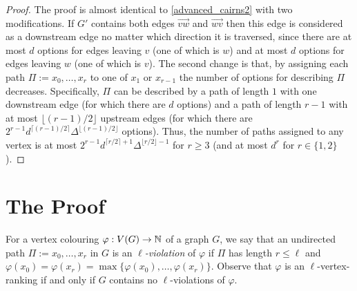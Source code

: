 \documentclass{patmorin}
\newcommand{\defin}[1]{\emph{\color{brightmaroon}#1}}
\newcommand{\rn}[1]{\chi_{\operatorname{#1-vr}}}
\newcommand{\lrn}{\rn{\ell}}
\begin{document}
\begin{proof}
  The proof is almost identical to \cref{advanced_cairns2} with two modifications.  If $G'$ contains both edges $\overrightarrow{vw}$ and $\overrightarrow{wv}$ then this edge is considered as a downstream edge no matter which direction it is traversed, since there are at most $d$ options for edges leaving $v$ (one of which is $w$) and at most $d$ options for edges leaving $w$ (one of which is $v$).  The second change is that, by assigning each path $\Pi:=x_0,\ldots,x_r$ to one of $x_1$ or $x_{r-1}$ the number of options for describing $\Pi$ decreases.  Specifically, $\Pi$ can be described by a path of length $1$ with one downstream edge (for which there are $d$ options) and a path of length $r-1$ with at most $\lfloor (r-1)/2\rfloor$ upstream edges (for which there are $2^{r-1}d^{\lceil (r-1)/2\rceil}\Delta^{\lfloor(r-1)/2\rfloor}$ options).  Thus, the number of paths assigned to any vertex is at most $2^{r-1}d^{\lceil r/2\rceil+1}\Delta^{\lfloor r/2\rfloor-1}$ for $r\ge 3$ (and at most $d^r$ for $r\in\{1,2\}$).
\end{proof}


\section{The Proof}

For a vertex colouring $\varphi:V(G)\to\mathbb{N}$ of a graph $G$, we say that an undirected path $\Pi:=x_0,\ldots,x_r$ in $G$ is an \defin{$\ell$-violation} of $\varphi$ if $\Pi$ has length $r\le\ell$ and $\varphi(x_0)=\varphi(x_r)=\max\{\varphi(x_0),\ldots,\varphi(x_r)\}$.  Observe that $\varphi$ is an $\ell$-vertex-ranking if and only if $G$ contains no $\ell$-violations of $\varphi$.

\end{document}
